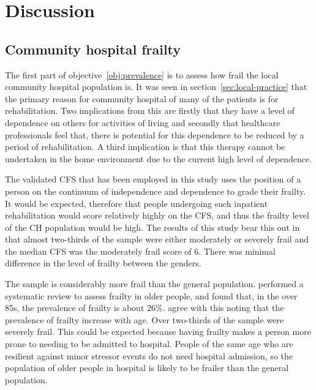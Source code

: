 \documentclass
[
	12pt,
	a4paper,
	oneside,
]{report}
\begin{document}
\chapter{Discussion}

\section{Community hospital frailty}

The first part of objective~\ref{obj:prevalence} is to assess how frail the
local community hospital population is. It was seen in 
section~\ref{sec:local-practice} that the primary reason for community 
hospital of many of the patients is for rehabilitation. Two implications from
this are firstly that they have a level of dependence on others for activities 
of living and secondly that healthcare professionals feel that, there is 
potential for this dependence to be reduced by a period of rehabilitation. A 
third implication is that this therapy cannot be undertaken in the home
environment due to the current high level of dependence.

The validated CFS that has been employed in this study uses the position of a person
on the continuum of independence and dependence to grade their frailty. It
would be expected, therefore that people undergoing such inpatient rehabilitation 
would score relatively highly on the CFS, and thus the frailty level of the 
CH population would be high. The results of this study bear this out in that
almost two-thirds of the sample were either moderately or severely frail
and the median CFS was the moderately frail score of 6. There was minimal
difference in the level of frailty between the genders.

The sample is considerably more frail than the general population. 
\textcite{collard:12} performed a systematic review to assess frailty in older
people, and found that, in the over 85s, the prevalence of frailty is about
26\%. \textcite{clegg:13} agree with this noting that the prevalence of frailty
increase with age. Over two-thirds of the sample were severely frail. This could
be expected because having frailty makes a person more prone to needing to be
admitted to hospital. People of the same age who are resilient against
minor stressor events do not need hospital admission, so the population of older
people in hospital is likely to be frailer than the general population.
\end{document}
